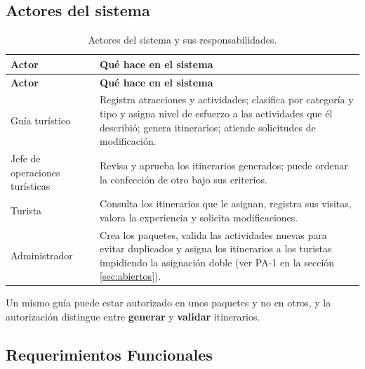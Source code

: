 \documentclass[11pt,a4paper]{article}
\begin{document}
\subsection{Actores del sistema}
{\footnotesize\setlength{\tabcolsep}{3pt}\renewcommand{\arraystretch}{1.15}
\begin{longtable}{|>{\raggedright\arraybackslash}p{3.78cm}|>{\raggedright\arraybackslash}p{11.98cm}|}
\caption{Actores del sistema y sus responsabilidades.}\label{tab:actores}\\ \hline
\rowcolor{gray!20} \textbf{Actor} & \textbf{Qué hace en el sistema} \\ \hline
\endfirsthead
\hline \rowcolor{gray!20} \textbf{Actor} & \textbf{Qué hace en el sistema} \\ \hline
\endhead
Guía turístico & Registra atracciones y actividades; clasifica por categoría y tipo y asigna nivel de esfuerzo a las actividades que él describió; genera itinerarios; atiende solicitudes de modificación. \\ \hline
Jefe de operaciones turísticas & Revisa y aprueba los itinerarios generados; puede ordenar la confección de otro bajo sus criterios. \\ \hline
Turista & Consulta los itinerarios que le asignan, registra sus visitas, valora la experiencia y solicita modificaciones. \\ \hline
Administrador & Crea los paquetes, valida las actividades nuevas para evitar duplicados y asigna los itinerarios a los turistas impidiendo la asignación doble (ver PA-1 en la sección \ref{sec:abiertos}). \\ \hline
\end{longtable}}
\vspace{2pt}
Un mismo guía puede estar autorizado en unos paquetes y no en otros, y la autorización distingue entre \textbf{generar} y \textbf{validar} itinerarios.

\subsection{Requerimientos Funcionales}
\end{document}
